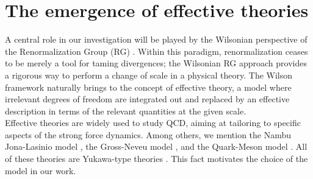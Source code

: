 \section{The emergence of effective theories}
A central role in our investigation will be played by the Wilsonian perspective of the Renormalization Group (RG) \cite{WilsonRG1,WilsonRG2,WILSON197475}. Within this paradigm, renormalization ceases to be merely a tool for taming divergences; 
the Wilsonian RG approach provides a rigorous way to perform a change of scale in a physical theory. The Wilson framework naturally brings to the concept of effective theory, a model where irrelevant degrees of freedom are integrated out and replaced by an effective description in terms of the relevant quantities at the given scale.  \\
Effective theories are widely used to study QCD, aiming at tailoring to specific aspects of the strong force dynamics. 
Among others, we mention the Nambu \textendash{} Jona-Lasinio model \cite{Nambu1961DynamicalI, Nambu1961DynamicalII}, the Gross-Neveu model \cite{grossneveu}, and the Quark-Meson model \cite{quarkmeson1,quarkmeson2,quarkmeson3}. All of these theories are Yukawa-type theories \cite{10.1143/PTPS.1.1}. This fact motivates the choice of the model in our work.
